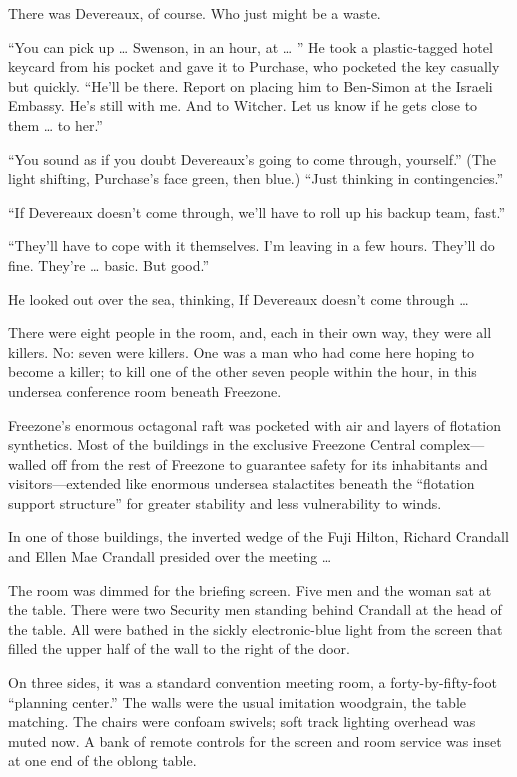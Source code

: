 There was Devereaux, of course. Who just might be a waste.

“You can pick up … Swenson, in an hour, at … ” He took a plastic-tagged hotel keycard from his pocket and gave it to Purchase, who pocketed the key casually but quickly. “He’ll be there. Report on placing him to Ben-Simon at the Israeli Embassy. He’s still with me. And to Witcher. Let us know if he gets close to them … to her.”

“You sound as if you doubt Devereaux’s going to come through, yourself.” (The light shifting, Purchase’s face green, then blue.) “Just thinking in contingencies.”

“If Devereaux doesn’t come through, we’ll have to roll up his backup team, fast.”

“They’ll have to cope with it themselves. I’m leaving in a few hours. They’ll do fine. They’re … basic. But good.”

He looked out over the sea, thinking, If Devereaux doesn’t come through …

There were eight people in the room, and, each in their own way, they were all killers. No: seven were killers. One was a man who had come here hoping to become a killer; to kill one of the other seven people within the hour, in this undersea conference room beneath Freezone.

Freezone’s enormous octagonal raft was pocketed with air and layers of flotation synthetics. Most of the buildings in the exclusive Freezone Central complex—walled off from the rest of Freezone to guarantee safety for its inhabitants and visitors—extended like enormous undersea stalactites beneath the “flotation support structure” for greater stability and less vulnerability to winds.

In one of those buildings, the inverted wedge of the Fuji Hilton, Richard Crandall and Ellen Mae Crandall presided over the meeting …

The room was dimmed for the briefing screen. Five men and the woman sat at the table. There were two Security men standing behind Crandall at the head of the table. All were bathed in the sickly electronic-blue light from the screen that filled the upper half of the wall to the right of the door.

On three sides, it was a standard convention meeting room, a forty-by-fifty-foot “planning center.” The walls were the usual imitation woodgrain, the table matching. The chairs were confoam swivels; soft track lighting overhead was muted now. A bank of remote controls for the screen and room service was inset at one end of the oblong table.

